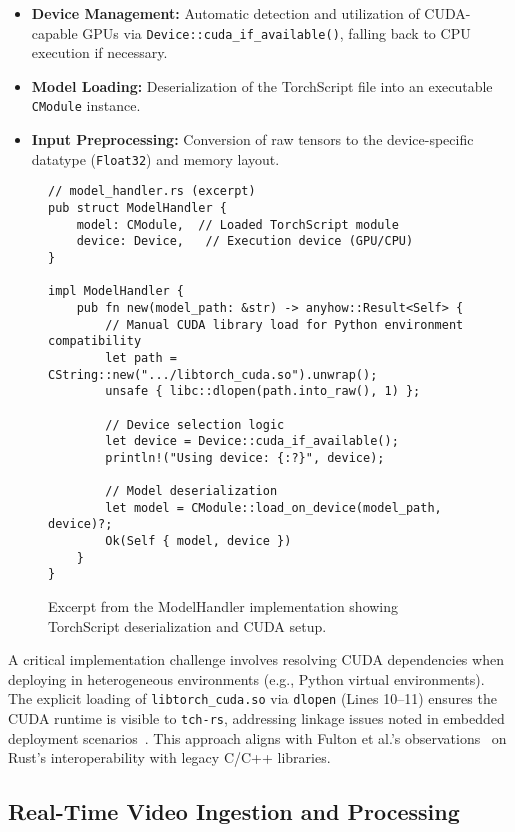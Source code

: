 \begin{itemize}
  \item \textbf{Device Management:} Automatic detection and utilization of CUDA-capable GPUs via \texttt{Device::cuda\_if\_available()}, falling back to CPU execution if necessary.
  \item \textbf{Model Loading:} Deserialization of the TorchScript file into an executable \texttt{CModule} instance.
  \item \textbf{Input Preprocessing:} Conversion of raw tensors to the device-specific datatype (\texttt{Float32}) and memory layout.
\end{itemize}

\begin{figure}[htbp]
\centering
\begin{verbatim}
// model_handler.rs (excerpt)
pub struct ModelHandler {
    model: CModule,  // Loaded TorchScript module
    device: Device,   // Execution device (GPU/CPU)
}

impl ModelHandler {
    pub fn new(model_path: &str) -> anyhow::Result<Self> {
        // Manual CUDA library load for Python environment compatibility
        let path = CString::new(".../libtorch_cuda.so").unwrap();
        unsafe { libc::dlopen(path.into_raw(), 1) };

        // Device selection logic
        let device = Device::cuda_if_available();
        println!("Using device: {:?}", device);

        // Model deserialization
        let model = CModule::load_on_device(model_path, device)?;
        Ok(Self { model, device })
    }
}
\end{verbatim}
\caption{Excerpt from the ModelHandler implementation showing TorchScript deserialization and CUDA setup.}
\label{lst:model_handler}
\end{figure}

A critical implementation challenge involves resolving CUDA dependencies when deploying in heterogeneous environments (e.g., Python virtual environments). The explicit loading of \texttt{libtorch\_cuda.so} via \texttt{dlopen} (Lines 10--11) ensures the CUDA runtime is visible to \texttt{tch-rs}, addressing linkage issues noted in embedded deployment scenarios~\cite{carnelos2025microflow, sharma2023rust}. This approach aligns with Fulton et al.'s observations~\cite{fulton2022benefits} on Rust's interoperability with legacy C/C++ libraries.

\subsection{Real-Time Video Ingestion and Processing}
\label{subsec:realtime_ingestion}


